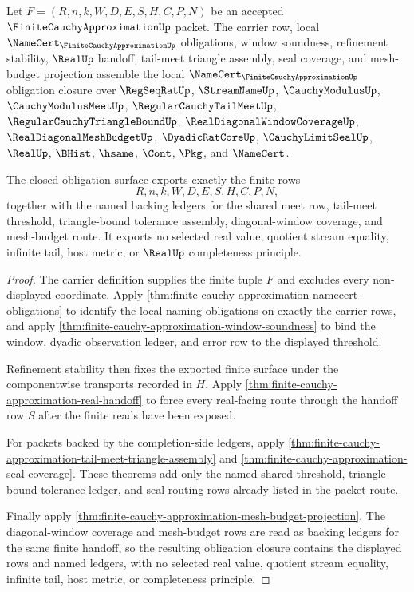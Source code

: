 \begin{theorem}
\label{thm:finite-cauchy-approximation-obligation-closure}
Let $F=(R,n,k,W,D,E,S,H,C,P,N)$ be an accepted $\FiniteCauchyApproximationUp$ packet. The carrier row, local $\NameCert_{\FiniteCauchyApproximationUp}$ obligations, window soundness, refinement stability, $\RealUp$ handoff, tail-meet triangle assembly, seal coverage, and mesh-budget projection assemble the local $\NameCert_{\FiniteCauchyApproximationUp}$ obligation closure over $\RegSeqRatUp$, $\StreamNameUp$, $\CauchyModulusUp$, $\CauchyModulusMeetUp$, $\RegularCauchyTailMeetUp$, $\RegularCauchyTriangleBoundUp$, $\RealDiagonalWindowCoverageUp$, $\RealDiagonalMeshBudgetUp$, $\DyadicRatCoreUp$, $\CauchyLimitSealUp$, $\RealUp$, $\BHist$, $\hsame$, $\Cont$, $\Pkg$, and $\NameCert$.

The closed obligation surface exports exactly the finite rows
$$
R,n,k,W,D,E,S,H,C,P,N,
$$
together with the named backing ledgers for the shared meet row, tail-meet threshold, triangle-bound tolerance assembly, diagonal-window coverage, and mesh-budget route. It exports no selected real value, quotient stream equality, infinite tail, host metric, or $\RealUp$ completeness principle.
\end{theorem}
\begin{proof}
The carrier definition supplies the finite tuple $F$ and excludes every non-displayed coordinate. Apply \autoref{thm:finite-cauchy-approximation-namecert-obligations} to identify the local naming obligations on exactly the carrier rows, and apply \autoref{thm:finite-cauchy-approximation-window-soundness} to bind the window, dyadic observation ledger, and error row to the displayed threshold.

Refinement stability then fixes the exported finite surface under the componentwise transports recorded in $H$. Apply \autoref{thm:finite-cauchy-approximation-real-handoff} to force every real-facing route through the handoff row $S$ after the finite reads have been exposed.

For packets backed by the completion-side ledgers, apply \autoref{thm:finite-cauchy-approximation-tail-meet-triangle-assembly} and \autoref{thm:finite-cauchy-approximation-seal-coverage}. These theorems add only the named shared threshold, triangle-bound tolerance ledger, and seal-routing rows already listed in the packet route.

Finally apply \autoref{thm:finite-cauchy-approximation-mesh-budget-projection}. The diagonal-window coverage and mesh-budget rows are read as backing ledgers for the same finite handoff, so the resulting obligation closure contains the displayed rows and named ledgers, with no selected real value, quotient stream equality, infinite tail, host metric, or completeness principle.
\end{proof}

